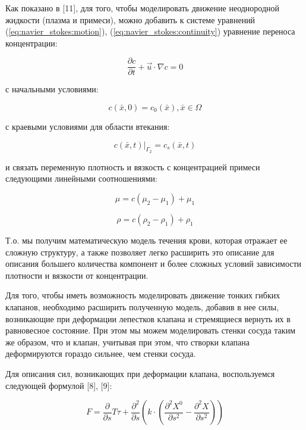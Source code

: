 Как показано в {[}11{]}, для того, чтобы моделировать движение
неоднородной жидкости (плазма и примеси), можно добавить к системе
уравнений (\ref{eq:navier_stokes:motion}),
(\ref{eq:navier_stokes:continuity}) уравнение переноса концентрации:

\begin{equation}\frac{\partial c}{\partial t} + \vec{u} \cdot \nabla c = 0\label{eq:convection}\end{equation}

с начальными условиями:

\begin{equation}c(\bar{x}, 0) = c_0(\bar{x}), \bar{x} \in \Omega\label{eq:convection:conditions}\end{equation}

с краевыми условиями для области втекания:

\begin{equation}c(\bar{x}, t)|_{\Gamma_2} = c_s(\bar{x}, t)\label{eq:convection:conditions}\end{equation}

и связать переменную плотность и вязкость с концентрацией примеси
следующими линейными соотношениями:

\begin{equation}\mu = c (\mu_2 - \mu_1) + \mu_1\label{eq:viscosity}\end{equation}

\begin{equation}\rho = c (\rho_2 - \rho_1) + \rho_1\label{eq:density}\end{equation}

Т.о. мы получим математическую модель течения крови, которая отражает ее
сложную структуру, а также позволяет легко расширить это описание для
описания большего количества компонент и более сложных условий
зависимости плотности и вязкости от концентрации.

Для того, чтобы иметь возможность моделировать движение тонких гибких
клапанов, необходимо расширить полученную модель, добавив в нее силы,
возникающие при деформации лепестков клапана и стремящиеся вернуть их в
равновесное состояние. При этом мы можем моделировать стенки сосуда
таким же образом, что и клапан, учитывая при этом, что створки клапана
деформируются гораздо сильнее, чем стенки сосуда.

Для описания сил, возникающих при деформации клапана, воспользуемся
следующей формулой {[}8{]}, {[}9{]}:

\begin{equation}F = \frac{\partial}{\partial s} T \tau + \frac{\partial^2}{\partial s} \left( k \cdot \left(\frac{\partial^2 X^0}{\partial s^2} - \frac{\partial^2 X}{\partial s^2} \right) \right)\label{eq:resulting_force}\end{equation}


